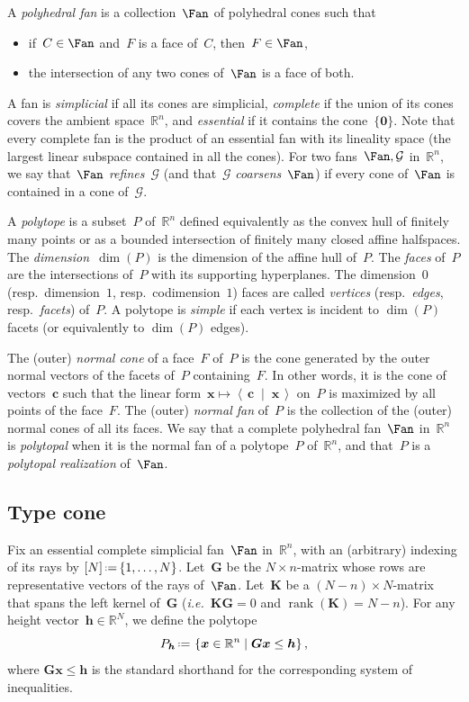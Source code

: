 \documentclass{amsart}
\theoremstyle{definition}
\newcommand{\R}{\mathbb{R}} %
\newcommand{\cal}[1]{{\mathcal{#1}}} %
\renewcommand{\b}[1]{{\boldsymbol{#1}}} %
\newcommand{\set}[2]{\left\{ #1 \;\middle|\; #2 \right\}} %
\newcommand{\dotprod}[2]{\left\langle \, #1 \; \middle| \; #2 \, \right\rangle} %
\newcommand{\eqdef}{\mbox{\,\raisebox{0.2ex}{\scriptsize\ensuremath{\mathrm:}}\ensuremath{=}\,}} %
\DeclareMathOperator{\rank}{rank} %
\newcommand{\ie}{\textit{i.e.}~} %
\newcommand{\darkblue}{\color{darkblue}} %
\newcommand{\defn}[1]{\textsl{\darkblue #1}} %
\begin{document}
A \defn{polyhedral fan} is a collection~$\Fan$ of polyhedral cones such that
\begin{itemize}
\item if~$C \in \Fan$ and~$F$ is a face of~$C$, then~$F \in \Fan$,
\item the intersection of any two cones of~$\Fan$ is a face of both.
\end{itemize}
A fan is \defn{simplicial} if all its cones are simplicial, \defn{complete} if the union of its cones covers the ambient space~$\R^n$, and \defn{essential} if it contains the cone~$\{\b{0}\}$. Note that every complete fan is the product of an essential fan with its lineality space (the largest linear subspace contained in all the cones).
For two fans~$\Fan, \cal{G}$ in~$\R^n$, we say that~$\Fan$ \defn{refines}~$\cal{G}$ (and that~$\cal{G}$ \defn{coarsens}~$\Fan$) if every cone of~$\Fan$ is contained in a cone of~$\cal{G}$.

A \defn{polytope} is a subset~$P$ of~$\R^n$ defined equivalently as the convex hull of finitely many points or as a bounded intersection of finitely many closed affine halfspaces.
The \defn{dimension}~$\dim(P)$ is the dimension of the affine hull of~$P$.
The \defn{faces} of~$P$ are the intersections of~$P$ with its supporting hyperplanes.
The dimension~$0$ (resp.~dimension~$1$, resp.~codimension~$1$) faces are called \defn{vertices} (resp.~\defn{edges}, resp.~\defn{facets}) of~$P$.
A polytope is \defn{simple} if each vertex is incident to $\dim(P)$ facets (or equivalently to $\dim(P)$ edges).

The (outer) \defn{normal cone} of a face~$F$ of~$P$ is the cone generated by the outer normal vectors of the facets of~$P$ containing~$F$.
In other words, it is the cone of vectors~$\b{c}$ such that the linear form~${\b{x} \mapsto \dotprod{\b{c}}{\b{x}}}$ on~$P$ is maximized by all points of the face~$F$.
The (outer) \defn{normal fan} of~$P$ is the collection of the (outer) normal cones of all its faces.
We say that a complete polyhedral fan~$\Fan$ in~$\R^n$ is \defn{polytopal} when it is the normal fan of a polytope~$P$ of~$\R^n$, and that~$P$ is a \defn{polytopal realization} of~$\Fan$.


\subsection{Type cone}
\label{ssec:type cone}

Fix an essential complete simplicial fan~$\Fan$ in~$\R^n$, with an (arbitrary) indexing of its rays by $[N] \eqdef \{1,\dots,N\}$. Let~$\b{G}$ be the $N \times n$-matrix whose rows are representative vectors of the rays of~$\Fan$. Let~$\b{K}$ be a $(N-n) \times N$-matrix that spans the left kernel of~$\b{G}$ (\ie $\b{K}\b{G} = 0$ and $\rank(\b{K})=N-n$). For any height vector~$\b{h} \in \R^N$, we define the polytope
\[
P_\b{h} \eqdef \set{\b{x} \in \R^n}{\b{G}\b{x} \le \b{h}},
\]
where $\b{G}\b{x} \le \b{h}$ is the standard shorthand for the corresponding system of inequalities.
\end{document}
